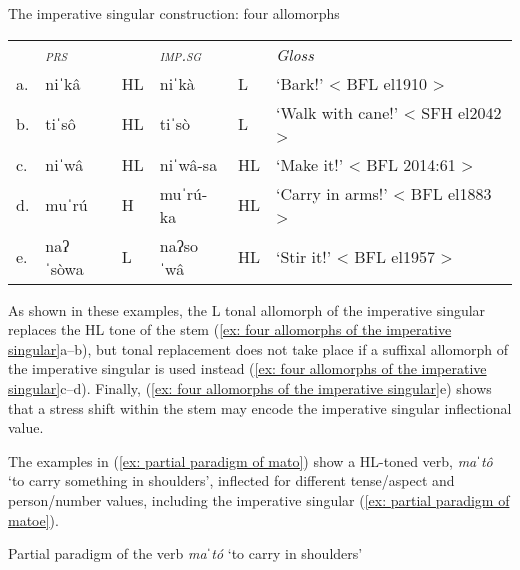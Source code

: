 
\ea\label{ex: four allomorphs of the imperative singular}
{The imperative singular construction: four allomorphs}
\setlength{\tabcolsep}{4pt}
\begin{tabular}{llllll}
    & \textit{\textsc{prs}} & & \textit{\textsc{imp.sg}} &  &\textit{Gloss}\\
     a.& niˈkâ & HL &  niˈkà &L &	‘Bark!' < BFL el1910 >\\
     b.& tiˈsô &HL& tiˈsò &L &	‘Walk with cane!' < SFH el2042 >\\
     c.& niˈwâ &	HL & niˈwâ-sa  &HL&	‘Make it!' < BFL 2014:61 >\\
     d.& muˈrú & H &	muˈrú-ka &HL&	‘Carry in arms!' < BFL el1883 >\\
     e.& naʔˈsòwa 	& L& naʔsoˈwâ  & HL & ‘Stir it!' < BFL el1957 >\\
\end{tabular}
    \z


As shown in these examples, the L tonal allomorph of the imperative singular replaces the HL tone of the stem (\ref{ex: four allomorphs of the imperative singular}a--b), but tonal replacement does not take place if a suffixal allomorph of the imperative singular is used instead (\ref{ex: four allomorphs of the imperative singular}c--d). Finally, (\ref{ex: four allomorphs of the imperative singular}e) shows that a stress shift within the stem may encode the imperative singular inflectional value.

The examples in (\ref{ex: partial paradigm of mato}) show a HL-toned verb, \textit{ma}ˈ\textit{tô} ‘to carry something in shoulders’, inflected for different tense/aspect and person/number values, including the imperative singular (\ref{ex: partial paradigm of matoe}).

\ea\label{ex: partial paradigm of mato}
{Partial paradigm of the verb \textit{maˈtó} ‘to carry in shoulders’}

